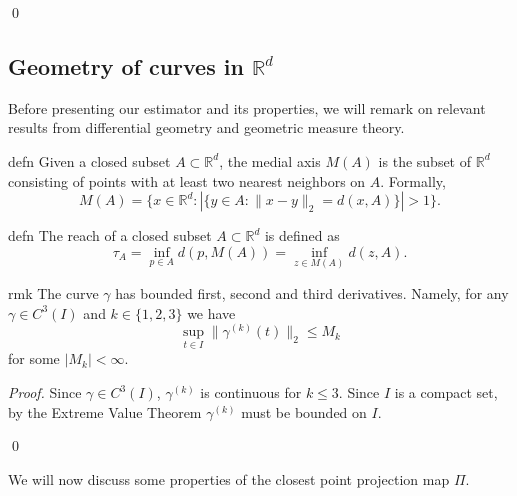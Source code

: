 \documentclass[11pt]{article}
\begin{document}
\qed{}

\subsection{Geometry of curves in $\mathbb{R}^d$}
Before presenting our estimator and its properties, we will remark on relevant results from differential geometry and geometric measure theory. 


\begin{restatable}{defn}{}
    Given a closed subset $A \subset \mathbb{R}^d$, the medial axis $M(A)$ is the subset of $\mathbb{R}^d$ consisting of points with at least two nearest neighbors on $A$. Formally,
    \begin{equation}
    M(A) = \{x \in \mathbb{R}^d : |\{y \in A : \|x-y\|_2 = d(x,A)\}| > 1\}. \label{eq: medial axis definition}
    \end{equation}
\end{restatable}

\begin{restatable}{defn}{}
    The reach of a closed subset $A \subset \mathbb{R}^d$ is defined as 
    \begin{equation}
        \tau_A = \inf_{p\in A} d(p,M(A)) = \inf_{z\in M(A)}d(z,A). \label{eq: reach definition}
    \end{equation}
\end{restatable}


\begin{restatable}{rmk}{} \label{remark: deriv bound}
    The curve $\gamma$ has bounded first, second and third derivatives. Namely, for any $\gamma \in C^3(I)$ and $k \in \{1,2,3\}$ we have 
    \[\sup_{t\in I}\|\gamma^{(k)}(t)\|_2 \leq M_k\]
    for some $|M_k| < \infty$.
\end{restatable}
\noindent \textit{Proof.} Since $\gamma \in C^3(I)$, $\gamma^{(k)}$ is continuous for $k \leq 3$. Since $I$ is a compact set, by the Extreme Value Theorem $\gamma^{(k)}$ must be bounded on $I$. 

\qed{}


\noindent We will now discuss some properties of the closest point projection map $\Pi$. 
\end{document}
